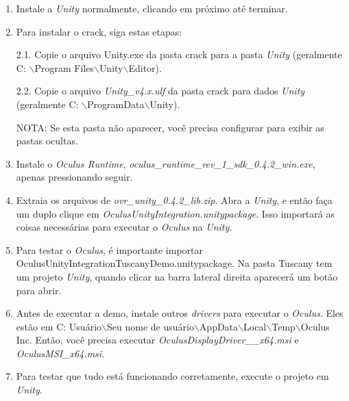 \begin{enumerate}
\item Instale a \textit{Unity} normalmente, clicando em próximo até terminar.

\item Para instalar o crack, siga estas etapas:

2.1. Copie o arquivo Unity.exe da pasta crack para a pasta \textit{Unity} (geralmente C: $\backslash$Program Files$\backslash$Unity$\backslash$Editor).

2.2. Copie o arquivo \textit{Unity\_v4.x.ulf} da pasta crack para dados \textit{Unity} (geralmente C: $\backslash$ProgramData$\backslash$Unity).

NOTA: Se esta pasta não aparecer, você precisa configurar para exibir as pastas ocultas.

\item Instale o \textit{Oculus Runtime}, \textit{oculus\_runtime\_rev\_1\_sdk\_0.4.2\_win.exe}, apenas pressionando seguir.

\item Extraia os arquivos de \textit{ovr\_unity\_0.4.2\_lib.zip}. Abra a \textit{Unity}, e então faça um duplo clique em \textit{OculusUnityIntegration.unitypackage}. Isso importará as coisas necessárias para executar o \textit{Oculus} na \textit{Unity}.

\item Para testar o \textit{Oculus}, é importante importar OculusUnityIntegrationTuscanyDemo.unitypackage. Na pasta Tuscany tem um projeto \textit{Unity}, quando clicar na barra lateral direita aparecerá um botão para abrir.

\item Antes de executar a demo, instale outros \textit{drivers} para executar o \textit{Oculus}. Eles estão em C: Usuário$\backslash$Seu nome de usuário$\backslash$AppData$\backslash$Local$\backslash$Temp$\backslash$Oculus Inc. Então, você precisa executar \textit{OculusDisplayDriver\_\_x64.msi} e \textit{OculusMSI\_x64.msi}.

\item Para testar que tudo está funcionando corretamente, execute o projeto em \textit{Unity}.
\end{enumerate}
